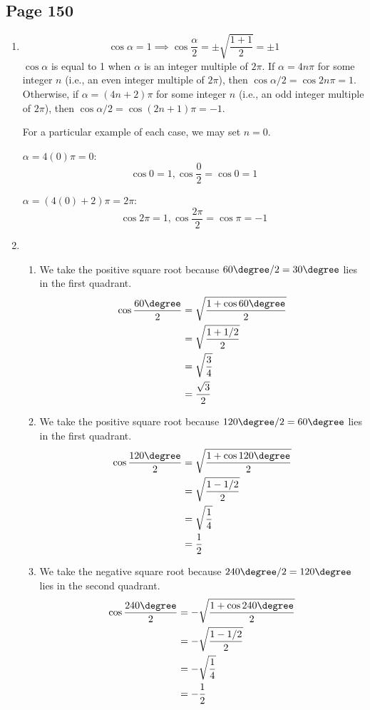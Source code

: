 \documentclass{article}
\newenvironment{solutions}[1]
{\subsection*{#1}
 \begin{enumerate}[leftmargin=1.5em]}
{\end{enumerate}}
\newcommand{\solution}{\item}
\newenvironment{subsolutions}
{\begin{enumerate}}
{\end{enumerate}}
\newcommand{\subsolution}{\item}
\begin{document}
\begin{solutions}{Page 150}
\solution %
\[
\cos{\alpha}=1 \implies \cos{\dfrac{\alpha}{2}} = \pm \sqrt{\dfrac{1+1}{2}} = \pm 1
\]
$\cos{\alpha}$ is equal to 1 when $\alpha$ is an integer multiple of $2\pi$. If $\alpha = 4n\pi$ for some integer $n$ (i.e., an even integer multiple of $2\pi$), then $\cos{\alpha/2} = \cos{2n\pi} = 1$. Otherwise, if $\alpha = \left(4n+2\right)\pi$ for some integer $n$ (i.e., an odd integer multiple of $2\pi$), then $\cos{\alpha/2} = \cos\left(2n+1\right)\pi = -1$.

For a particular example of each case, we may set $n=0$.

$\alpha = 4\left(0\right)\pi = 0$:
\[
\cos{0} = 1, \cos{\dfrac{0}{2}} = \cos{0} = 1
\]

$\alpha = \left(4\left(0\right)+2\right)\pi = 2\pi$:
\[
\cos{2\pi} = 1, \cos{\dfrac{2\pi}{2}} = \cos{\pi} = -1
\]

\solution %
\begin{subsolutions}
\subsolution %
We take the positive square root because $60\degree / 2 = 30\degree$ lies in the first quadrant.
\begin{align*}
\cos \dfrac{60\degree}{2} &= \sqrt{\dfrac{1+\cos{60\degree}}{2}} \\
&= \sqrt{\dfrac{1+1/2}{2}} \\
&= \sqrt{\dfrac{3}{4}} \\
&= \dfrac{\sqrt{3}}{2}
\end{align*}

\subsolution %
We take the positive square root because $120\degree / 2 = 60\degree$ lies in the first quadrant.
\begin{align*}
\cos \dfrac{120\degree}{2} &= \sqrt{\dfrac{1+\cos{120\degree}}{2}} \\
&= \sqrt{\dfrac{1-1/2}{2}} \\
&= \sqrt{\dfrac{1}{4}} \\
&= \dfrac{1}{2}
\end{align*}

\subsolution %
We take the negative square root because $240\degree / 2 = 120\degree$ lies in the second quadrant.
\begin{align*}
\cos \dfrac{240\degree}{2} &= -\sqrt{\dfrac{1+\cos{240\degree}}{2}} \\
&= -\sqrt{\dfrac{1-1/2}{2}} \\
&= -\sqrt{\dfrac{1}{4}} \\
&= -\dfrac{1}{2}
\end{align*}
\end{subsolutions}


\end{solutions}
\end{document}
